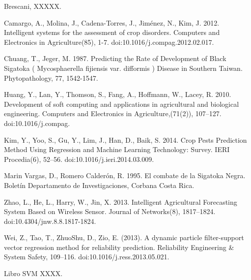 \documentclass[review]{elsarticle}
\begin{document}
\begin{thebibliography}{1}

 Brescani, XXXXX.

 Camargo, A., Molina, J., Cadena-Torres, J., Jim\'enez, N., Kim, J. 2012. Intelligent systems for the assessment of crop disorders. Computers and Electronics in Agriculture(85), 1-7. doi:10.1016/j.compag.2012.02.017.

 Chuang, T., Jeger, M. 1987. Predicting the Rate of Development of Black Sigatoka ( Mycosphaerella fijiensis var. difformis ) Disease in Southern Taiwan. Phytopathology, 77, 1542-1547.

 Huang, Y., Lan, Y., Thomson, S., Fang, A., Hoffmann, W., Lacey, R. 2010. Development of soft computing and applications in agricultural and biological engineering. Computers and Electronics in Agriculture,(71(2)), 107–127. doi:10.1016/j.compag.

 Kim, Y., Yoo, S., Gu, Y., Lim, J., Han, D.,  Baik, S. 2014. Crop Pests Prediction Method Using Regression and Machine Learning Technology: Survey. IERI Procedia(6), 52–56. doi:10.1016/j.ieri.2014.03.009.

 Marin Vargas, D., Romero Calderón, R. 1995. El combate de la Sigatoka Negra. Bolet\'in Departamento de Investigaciones, Corbana Costa Rica.

Zhao, L., He, L., Harry, W., Jin, X. 2013. Intelligent Agricultural Forecasting System Based on Wireless Sensor. Journal of Networks(8), 1817–1824. doi:10.4304/jnw.8.8.1817-1824.

 Wei, Z., Tao, T., ZhuoShu, D.,  Zio, E. (2013). A dynamic particle filter-support vector regression method for reliability prediction. Reliability Engineering \& System Safety, 109–116. doi:10.1016/j.ress.2013.05.021.

 Libro SVM XXXX.

\end{thebibliography}
\end{document}
